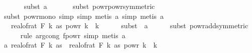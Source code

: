 \begin{isabellebody}
\ \ \ \ \ \isamarkupfalse%
\ {\isacharparenleft}{\kern0pt}subst\ a{}{\isacharparenright}{\kern0pt}\isanewline
\ \ \ \ \ \isamarkupfalse%
\ {\isacharparenleft}{\kern0pt}subst\ powr{\isacharunderscore}{\kern0pt}powr{\isacharbrackleft}{\kern0pt}symmetric{\isacharbrackright}{\kern0pt}{\isacharparenright}{\kern0pt}\isanewline
\ \ \ \ \isamarkupfalse%
\ {\isacharparenleft}{\kern0pt}subst\ powr{\isacharunderscore}{\kern0pt}mono{}{\isacharcomma}{\kern0pt}\ simp{\isacharcomma}{\kern0pt}\ simp{\isacharcomma}{\kern0pt}\ metis\ a{}{\isacharcomma}{\kern0pt}\ simp{\isacharcomma}{\kern0pt}\ metis\ a{}{\isacharparenright}{\kern0pt}\isanewline
\ \ \isamarkupfalse%
\ \isamarkupfalse%
\ {\isachardoublequoteopen}{\isachardot}{\kern0pt}{\isachardot}{\kern0pt}{\isachardot}{\kern0pt}\ {\isacharequal}{\kern0pt}\ {\isacharparenleft}{\kern0pt}real{\isacharunderscore}{\kern0pt}of{\isacharunderscore}{\kern0pt}rat\ {\isacharparenleft}{\kern0pt}F\ k\ as{\isacharparenright}{\kern0pt}{\isacharparenright}{\kern0pt}\ powr\ {\isacharparenleft}{\kern0pt}{\isacharparenleft}{\kern0pt}{}{\isacharasterisk}{\kern0pt}k{\isacharminus}{\kern0pt}{}{\isacharparenright}{\kern0pt}\ {\isacharslash}{\kern0pt}\ k{\isacharparenright}{\kern0pt}{\isachardoublequoteclose}\isanewline
\ \ \ \ \isamarkupfalse%
\ {\isacharparenleft}{\kern0pt}subst\ {\isacharparenleft}{\kern0pt}{}{\isacharparenright}{\kern0pt}\ a{}{\isacharparenright}{\kern0pt}\isanewline
\ \ \ \ \isamarkupfalse%
\ {\isacharparenleft}{\kern0pt}subst\ powr{\isacharunderscore}{\kern0pt}add{\isacharbrackleft}{\kern0pt}symmetric{\isacharbrackright}{\kern0pt}{\isacharparenright}{\kern0pt}\isanewline
\ \ \ \ \isamarkupfalse%
\ {\isacharparenleft}{\kern0pt}rule\ arg{\isacharunderscore}{\kern0pt}cong{}{\isacharbrackleft}{\kern0pt}\ f{\isacharequal}{\kern0pt}{\isachardoublequoteopen}{\isacharparenleft}{\kern0pt}powr{\isacharparenright}{\kern0pt}{\isachardoublequoteclose}{\isacharbrackright}{\kern0pt}{\isacharcomma}{\kern0pt}\ simp{\isacharcomma}{\kern0pt}\ metis\ a{}{\isacharparenright}{\kern0pt}\isanewline
\ \ \isamarkupfalse%
\ \isamarkupfalse%
\ a{\isacharcolon}{\kern0pt}\ {\isachardoublequoteopen}real{\isacharunderscore}{\kern0pt}of{\isacharunderscore}{\kern0pt}rat\ {\isacharparenleft}{\kern0pt}F\ {\isacharparenleft}{\kern0pt}{}{\isacharasterisk}{\kern0pt}k{\isacharminus}{\kern0pt}{}{\isacharparenright}{\kern0pt}\ as{\isacharparenright}{\kern0pt}\ {\isasymle}\ {\isacharparenleft}{\kern0pt}real{\isacharunderscore}{\kern0pt}of{\isacharunderscore}{\kern0pt}rat\ {\isacharparenleft}{\kern0pt}F\ k\ as{\isacharparenright}{\kern0pt}{\isacharparenright}{\kern0pt}\ powr\ {\isacharparenleft}{\kern0pt}{\isacharparenleft}{\kern0pt}{}{\isacharasterisk}{\kern0pt}k{\isacharminus}{\kern0pt}{}{\isacharparenright}{\kern0pt}\ {\isacharslash}{\kern0pt}\ k{\isacharparenright}{\kern0pt}{\isachardoublequoteclose}\isanewline

\end{isabellebody}
